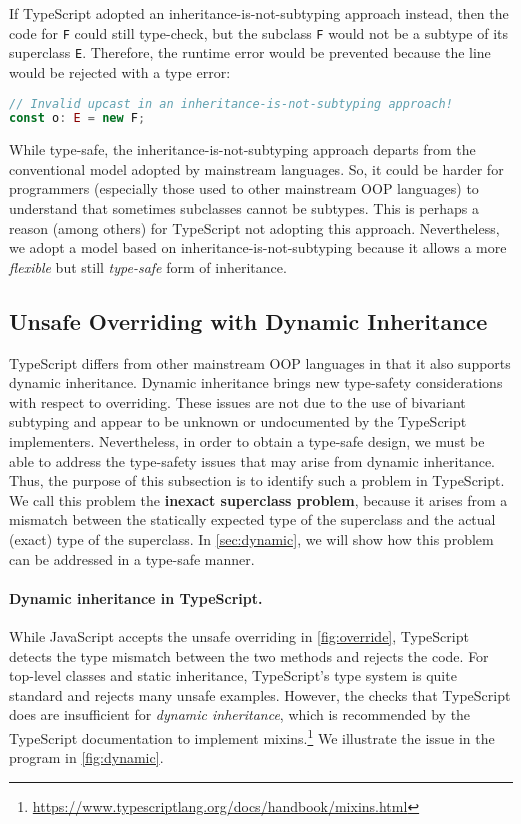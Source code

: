 If TypeScript adopted an inheritance-is-not-subtyping approach instead, then the
code for \lstinline{F} could still type-check, but the subclass \lstinline{F}
would not be a subtype of its superclass \lstinline{E}. Therefore, the runtime
error would be prevented because the line would be rejected with a type error:
\begin{lstlisting}[language=TypeScript]
// Invalid upcast in an inheritance-is-not-subtyping approach!
const o: E = new F;
\end{lstlisting}
While type-safe, the inheritance-is-not-subtyping approach departs from the
conventional model adopted by mainstream languages. So, it could be harder for
programmers (especially those used to other mainstream OOP languages) to
understand that sometimes subclasses cannot be subtypes. This is perhaps a
reason (among others) for TypeScript not adopting this approach. Nevertheless,
we adopt a model based on inheritance-is-not-subtyping because it allows a more
\emph{flexible} but still \emph{type-safe} form of inheritance.

\subsection{Unsafe Overriding with Dynamic Inheritance} \label{sec:override}

TypeScript differs from other mainstream OOP languages in that it also supports
dynamic inheritance. Dynamic inheritance brings new type-safety considerations
with respect to overriding. These issues are not due to the use of bivariant
subtyping and appear to be unknown or undocumented by the TypeScript
implementers. Nevertheless, in order to obtain a type-safe design, we must be
able to address the type-safety issues that may arise from dynamic inheritance.
Thus, the purpose of this subsection is to identify such a problem in
TypeScript. We call this problem the \textbf{inexact superclass problem},
because it arises from a mismatch between the statically expected type of the
superclass and the actual (exact) type of the superclass. In
\autoref{sec:dynamic}, we will show how this problem can be addressed in a
type-safe manner.

\paragraph{Dynamic inheritance in TypeScript.}
While JavaScript accepts the unsafe overriding in \autoref{fig:override},
TypeScript detects the type mismatch between the two methods and rejects the
code. For top-level classes and static inheritance, TypeScript's type system is
quite standard and rejects many unsafe examples. However, the checks that
TypeScript does are insufficient for \emph{dynamic inheritance}, which is
recommended by the TypeScript documentation to implement
mixins.\footnote{\url{https://www.typescriptlang.org/docs/handbook/mixins.html}}
We illustrate the issue in the program in \autoref{fig:dynamic}.

